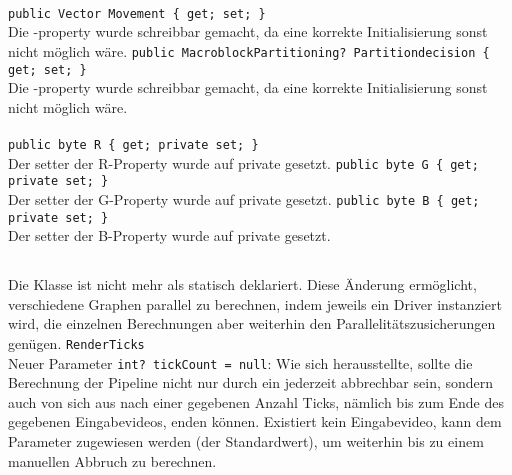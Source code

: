 \paragraph{}
\begin{itemize}
	\change \verb!public Vector Movement { get; set; }! \\
	Die -property wurde schreibbar gemacht, da eine korrekte Initialisierung sonst nicht möglich wäre.
	\change \verb!public MacroblockPartitioning? Partitiondecision { get; set; }! \\
	Die -property wurde schreibbar gemacht, da eine korrekte Initialisierung sonst nicht möglich wäre.
\end{itemize}

\paragraph{}
\begin{itemize}
	\change \verb!public byte R { get; private set; }! \\
	Der setter der R-Property wurde auf private gesetzt.
	\change \verb!public byte G { get; private set; }! \\
	Der setter der G-Property wurde auf private gesetzt.
	\change \verb!public byte B { get; private set; }! \\
	Der setter der B-Property wurde auf private gesetzt.
\end{itemize}

\subsection{}

\paragraph{}
\begin{itemize}
	\change Die Klasse ist nicht mehr als statisch deklariert. Diese Änderung ermöglicht, verschiedene Graphen parallel zu berechnen, indem jeweils ein Driver instanziert wird, die einzelnen Berechnungen aber weiterhin den Parallelitätszusicherungen genügen.
	\add \verb!RenderTicks! \\
	Neuer Parameter \verb!int? tickCount = null!: Wie sich herausstellte, sollte die Berechnung der Pipeline nicht nur durch ein  jederzeit abbrechbar sein, sondern auch von sich aus nach einer gegebenen Anzahl Ticks, nämlich bis zum Ende des gegebenen Eingabevideos, enden können. Existiert kein Eingabevideo, kann dem Parameter  zugewiesen werden (der Standardwert), um weiterhin bis zu einem manuellen Abbruch zu berechnen.
\end{itemize}

